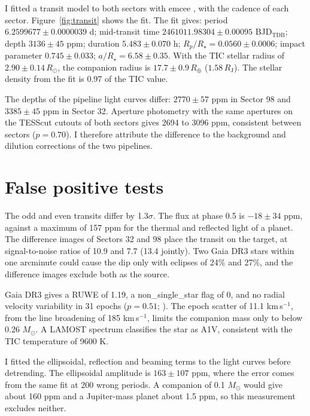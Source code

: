 \documentclass{aastex701}
\begin{document}
I fitted a transit model \citep{kreidberg2015} to both sectors with emcee \citep{foremanmackey2013}, with the cadence
of each sector. Figure~\ref{fig:transit} shows the fit. The fit gives:
period $6.2599677 \pm 0.0000039$ d;
mid-transit time $2461011.98304 \pm 0.00095$ BJD$_\mathrm{TDB}$;
depth $3136 \pm 45$ ppm;
duration $5.483 \pm 0.070$ h;
$R_p/R_\star = 0.0560 \pm 0.0006$;
impact parameter $0.745 \pm 0.033$;
$a/R_\star = 6.58 \pm 0.35$.
With the TIC stellar radius of $2.90 \pm 0.14\,R_\odot$, the companion radius is $17.7 \pm 0.9\,R_\oplus$
($1.58\,R_\mathrm{J}$). The stellar density from the fit is 0.97 of the TIC value.

The depths of the pipeline light curves differ: $2770 \pm 57$ ppm in Sector 98 and $3385 \pm 45$ ppm in Sector 32.
Aperture photometry with the same apertures on the TESScut cutouts \citep{brasseur2019} of both sectors gives 2694 to
3096 ppm, consistent between sectors ($p = 0.70$). I therefore attribute the difference to the background and
dilution corrections of the two pipelines.

\section{False positive tests}

The odd and even transits differ by 1.3$\sigma$. The flux at phase 0.5 is $-18 \pm 34$ ppm, against a maximum of 157 ppm
for the thermal and reflected light of a planet. The difference images \citep{bryson2013} of Sectors 32 and 98 place
the transit on the target, at signal-to-noise ratios of 10.9 and 7.7 (13.4 jointly). Two Gaia DR3 stars within one
arcminute could cause the dip only with eclipses of 24\% and 27\%, and the difference images exclude both as the
source.

Gaia DR3 \citep{gaia2023} gives a RUWE of 1.19, a non\_single\_star flag of 0, and no radial velocity variability
in 31 epochs ($p = 0.51$; \citealt{katz2023}). The epoch scatter of 11.1 km\,s$^{-1}$, from the line broadening of
185 km\,s$^{-1}$, limits the companion mass only to below 0.26 $M_\odot$. A LAMOST spectrum \citep{cui2012} classifies the
star as A1V, consistent with the TIC temperature of 9600 K.

I fitted the ellipsoidal, reflection and beaming terms \citep{faigler2011} to the light curves before detrending.
The ellipsoidal amplitude is $163 \pm 107$ ppm, where the error comes from the same fit at 200 wrong periods. A
companion of 0.1 $M_\odot$ would give about 160 ppm and a Jupiter-mass planet about 1.5 ppm, so this measurement
excludes neither.
\end{document}
